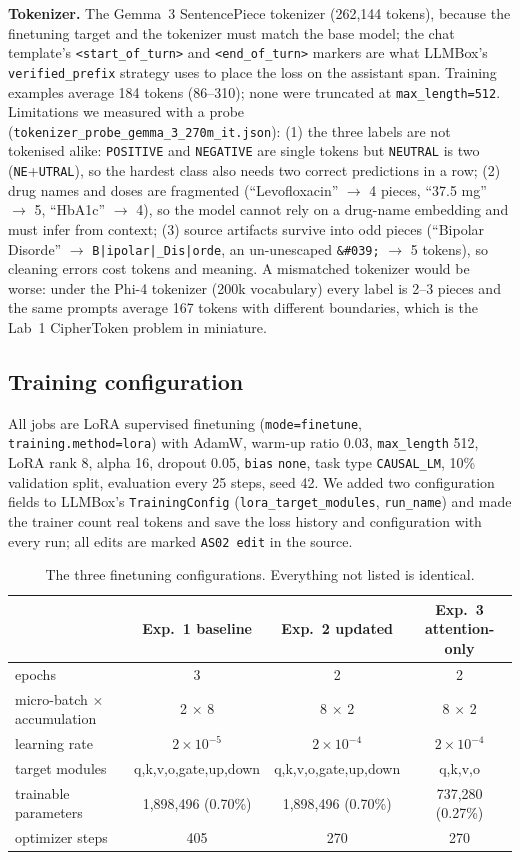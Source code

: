 \documentclass[11pt]{article}
\newcommand{\code}[1]{\texttt{#1}}
\begin{document}
\textbf{Tokenizer.} The Gemma~3 SentencePiece tokenizer (262,144 tokens), because the finetuning target and the tokenizer must match the base model; the chat template's \code{<start\_of\_turn>} and \code{<end\_of\_turn>} markers are what LLMBox's \code{verified\_prefix} strategy uses to place the loss on the assistant span. Training examples average 184 tokens (86--310); none were truncated at \code{max\_length=512}. Limitations we measured with a probe (\code{tokenizer\_probe\_gemma\_3\_270m\_it.json}): (1) the three labels are not tokenised alike: \code{POSITIVE} and \code{NEGATIVE} are single tokens but \code{NEUTRAL} is two (\code{NE}+\code{UTRAL}), so the hardest class also needs two correct predictions in a row; (2) drug names and doses are fragmented (``Levofloxacin'' $\to$ 4 pieces, ``37.5 mg'' $\to$ 5, ``HbA1c'' $\to$ 4), so the model cannot rely on a drug-name embedding and must infer from context; (3) source artifacts survive into odd pieces (``Bipolar Disorde'' $\to$ \code{B|ipolar|\_Dis|orde}, an un-unescaped \code{\&\#039;} $\to$ 5 tokens), so cleaning errors cost tokens and meaning. A mismatched tokenizer would be worse: under the Phi-4 tokenizer (200k vocabulary) every label is 2--3 pieces and the same prompts average 167 tokens with different boundaries, which is the Lab~1 CipherToken problem in miniature.

\subsection{Training configuration}
All jobs are LoRA supervised finetuning (\code{mode=finetune}, \code{training.method=lora}) with AdamW, warm-up ratio 0.03, \code{max\_length} 512, LoRA rank 8, alpha 16, dropout 0.05, \code{bias} \code{none}, task type \code{CAUSAL\_LM}, 10\% validation split, evaluation every 25 steps, seed 42. We added two configuration fields to LLMBox's \code{TrainingConfig} (\code{lora\_target\_modules}, \code{run\_name}) and made the trainer count real tokens and save the loss history and configuration with every run; all edits are marked \code{AS02 edit} in the source.

\begin{table}[H]\centering\small
\begin{tabular}{lccc}\toprule
& Exp.~1 baseline & Exp.~2 updated & Exp.~3 attention-only \\\midrule
epochs & 3 & 2 & 2 \\
micro-batch $\times$ accumulation & 2 $\times$ 8 & 8 $\times$ 2 & 8 $\times$ 2 \\
learning rate & $2\times10^{-5}$ & $2\times10^{-4}$ & $2\times10^{-4}$ \\
target modules & q,k,v,o,gate,up,down & q,k,v,o,gate,up,down & q,k,v,o \\
trainable parameters & 1,898,496 (0.70\%) & 1,898,496 (0.70\%) & 737,280 (0.27\%) \\
optimizer steps & 405 & 270 & 270 \\\bottomrule
\end{tabular}
\caption{The three finetuning configurations. Everything not listed is identical.}\label{tab:config}
\end{table}
\end{document}
